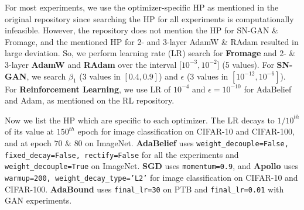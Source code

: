 For most experiments, we use the optimizer-specific HP as mentioned in the original repository since searching the HP for all experiments is computationally infeasible. However, the repository does not mention the HP for SN-GAN \& Fromage, and the mentioned HP for 2- and 3-layer AdamW \& RAdam resulted in large deviation. So, we perform learning rate (LR) search for \textbf{Fromage} and 2- \& 3-layer \textbf{AdamW} and \textbf{RAdam} over the interval [$10^{-3}, 10^{-2}$] (5 values). For \textbf{SN-GAN}, we search $\beta_1$ (3 values in $[0.4, 0.9]$) and $\epsilon$ (3 values in $[10^{-12}, 10^{-6}]$). For \textbf{Reinforcement Learning}, we use LR of $10^{-4}$ and $\epsilon = 10^{-10}$ for AdaBelief and Adam, as mentioned on the RL repository.

Now we list the HP which are specific to each optimizer. The LR decays to ${1/10}^{th}$ of its value at $150^{th}$ epoch for image classification on CIFAR-10 and CIFAR-100, and at epoch $70$ \& $80$ on ImageNet. \textbf{AdaBelief} uses \texttt{weight\_decouple=False, fixed\_decay=False, rectify=False} for all the experiments and \texttt{weight\_decouple=True} on ImageNet. \textbf{SGD} uses \texttt{momentum=0.9}, and \textbf{Apollo} uses \texttt{warmup=200, weight\_decay\_type='L2'} for image classification on CIFAR-10 and CIFAR-100. \textbf{AdaBound} uses \texttt{final\_lr=30} on PTB and \texttt{final\_lr=0.01} with GAN experiments.

    






